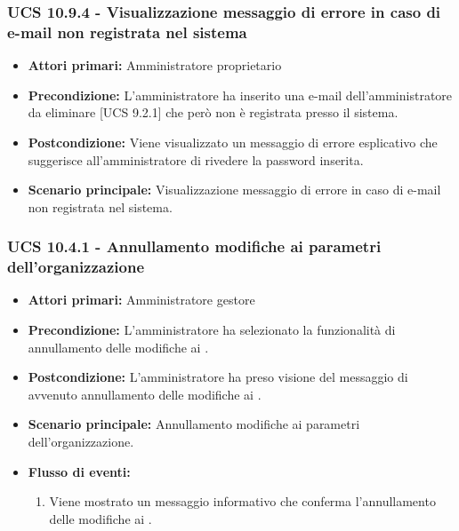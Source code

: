 \subsubsection{UCS 10.9.4 - Visualizzazione messaggio di errore in caso di e-mail non registrata nel sistema}%
\begin{itemize}
\item \textbf{Attori primari:} Amministratore proprietario
\item \textbf{Precondizione:} L'amministratore ha inserito una e-mail dell'amministratore da eliminare [UCS 9.2.1] che però non è registrata presso il sistema.
\item \textbf{Postcondizione:} Viene visualizzato un messaggio di errore esplicativo che suggerisce all'amministratore di rivedere la password inserita.
\item \textbf{Scenario principale:} Visualizzazione messaggio di errore in caso di e-mail non registrata nel sistema.
\end{itemize}

\subsubsection{UCS 10.4.1 - Annullamento modifiche ai parametri dell'organizzazione}%
\begin{itemize}
\item \textbf{Attori primari:} Amministratore gestore
\item \textbf{Precondizione:} L'amministratore ha selezionato la funzionalità di annullamento delle modifiche ai .
\item \textbf{Postcondizione:} L'amministratore ha preso visione del messaggio di avvenuto annullamento delle modifiche ai .
\item \textbf{Scenario principale:} Annullamento modifiche ai parametri dell'organizzazione.
\item \textbf{Flusso di eventi:}
    \begin{enumerate}
        \item Viene mostrato un messaggio informativo che conferma l'annullamento delle modifiche ai .
    \end{enumerate} 
\end{itemize}

